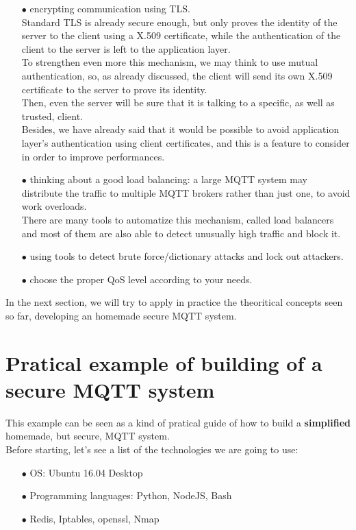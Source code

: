\documentclass[12pt]{report}
\begin{document}
{\begin{itemize}
\item[$\bullet$] encrypting communication using TLS.\\
Standard TLS is already secure enough, but only proves the identity of the server to the client using a X.509 certificate, while the authentication of the client to the server is left to the application layer.\\
To strengthen even more this mechanism, we may think to use mutual authentication, so, as already discussed, the client will send its own X.509 certificate to the server to prove its identity.\\
Then, even the server will be sure that it is talking to a specific, as well as trusted, client.\\
Besides, we have already said that it would be possible to avoid application layer's authentication using client certificates, and this is a feature to consider in order to improve performances.

\item[$\bullet$] thinking about a good load balancing: a large MQTT system may distribute the traffic to multiple MQTT brokers rather than just one, to avoid work overloads.\\
There are many tools to automatize this mechanism, called load balancers and most of them are also able to detect unusually high traffic and block it.
\item[$\bullet$] using tools to detect brute force/dictionary attacks and lock out attackers.
\item[$\bullet$] choose the proper QoS level according to your needs.\\
\end{itemize}

In the next section, we will try to apply in practice the theoritical concepts seen so far, developing an homemade secure MQTT system.\\

\section{Pratical example of building of a secure MQTT system}
\bigskip
This example can be seen as a kind of pratical guide of how to build a \textbf{simplified} homemade, but secure, MQTT system.\\
Before starting, let's see a list of the technologies we are going to use:
\bigskip
\begin{itemize}
\setlength{\itemindent}{+4mm}
\item[$\bullet$] OS: Ubuntu 16.04 Desktop
\item[$\bullet$] Programming languages: Python, NodeJS, Bash
\item[$\bullet$] Redis, Iptables, openssl, Nmap\\
\end{itemize}

}
\end{document}
